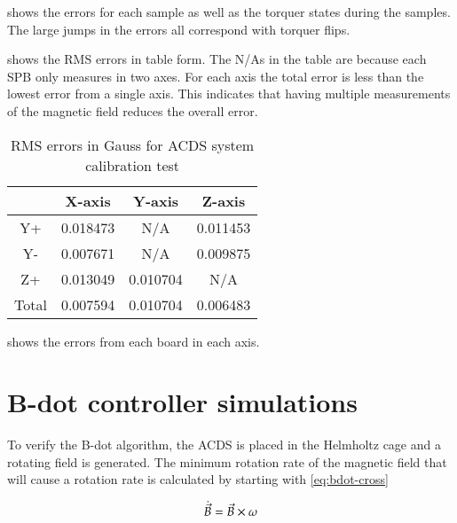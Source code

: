  shows the errors for each sample as well as the torquer states during the samples. The large jumps in the errors all correspond with torquer flips.

 shows the RMS errors in table form. The N/As in the table are because each \ac{SPB} only measures in two axes. For each axis the total error is less than the lowest error from a single axis. This indicates that having multiple measurements of the magnetic field reduces the overall error.

\begin{table}[!htb]
    \centering
    \caption{RMS errors in Gauss for \ac{ACDS} system calibration test}
    \label{tab:tcalMSPerr}
    \begin{tabular}{|c|c|c|c|}
        \hline
        &X-axis&Y-axis&Z-axis\\
        \hline
        Y+&0.018473&N/A&0.011453\\
        \hline
        Y-&0.007671&N/A&0.009875\\
        \hline
        Z+&0.013049&0.010704&N/A\\
        \hline
        Total&0.007594&0.010704&0.006483\\
        \hline
    \end{tabular}
\end{table}

 shows the errors from each board in each axis.


\section{B-dot controller simulations}

To verify the B-dot algorithm, the \ac{ACDS} is placed in the Helmholtz cage and a rotating field is generated. The minimum rotation rate of the magnetic field that will cause a rotation rate is calculated by starting with \cref{eq:bdot-cross}

\begin{equation}
    \dot{\vec{B}} = \vec{B} \times \omega
    \label{eq:bdot-cross}
\end{equation}

